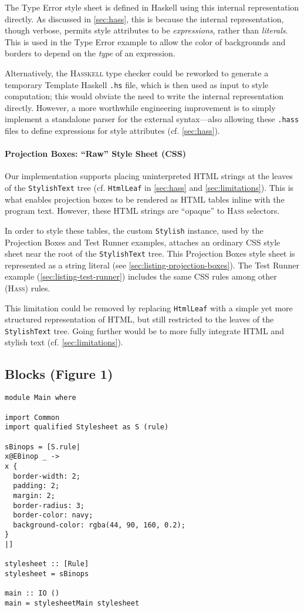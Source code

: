 \documentclass[acmsmall, screen]{acmart}
\newcommand{\parahead}[1]
  {\paragraph{\textbf{#1}}}
\newcommand{\hass}
{\textsc{Hass}}
\newcommand{\hasskell}
{\textsc{Hasskell}}
\begin{document}
\vspace{0.08in}

The Type Error style sheet is defined in Haskell using this internal representation directly.
As discussed in \autoref{sec:hass},
this is because the internal representation, though verbose, permits style attributes to be \emph{expressions}, rather than \emph{literals}.
This is used in the Type Error example to allow the color of backgrounds and borders to depend on the \textit{type} of an expression.

Alternatively, the \hasskell{} type checker could be reworked to generate a temporary Template Haskell \texttt{.hs} file, which is then used as input to style computation;
this would obviate the need to write the internal representation directly.
However, a more worthwhile engineering improvement is to simply implement a standalone parser for the external syntax---also allowing these \texttt{.hass} files to define expressions for style attributes (cf. \autoref{sec:hass}).

\parahead{Projection Boxes: ``Raw'' Style Sheet (CSS)}

Our implementation supports placing uninterpreted HTML strings at the leaves of the \texttt{StylishText} tree (cf. \texttt{HtmlLeaf} in \autoref{sec:hass} and \autoref{sec:limitations}).
This is what enables projection boxes to be rendered as HTML tables inline with the program text.
However, these HTML strings are ``opaque'' to \hass{} selectors. 

In order to style these tables, the custom \texttt{Stylish} instance, used by the Projection Boxes and Test Runner examples, attaches an ordinary CSS style sheet near the root of the \texttt{StylishText} tree.
This Projection Boxes style sheet is represented as a string literal (see \autoref{sec:listing-projection-boxes}).
The Test Runner example (\autoref{sec:listing-test-runner}) includes the same CSS rules among other (\hass{}) rules.

This limitation could be removed by replacing \texttt{HtmlLeaf} with a simple yet more structured representation of HTML, but still restricted to the leaves of the \texttt{StylishText} tree.
Going further would be to more fully integrate HTML and stylish text (cf. \autoref{sec:limitations}).

\clearpage

\subsection{Blocks (Figure 1)}
\label{sec:listing-blocks}
{\scriptsize
\begin{verbatim}
module Main where

import Common
import qualified Stylesheet as S (rule)

sBinops = [S.rule|
x@EBinop _ ->
x {
  border-width: 2;
  padding: 2;
  margin: 2;
  border-radius: 3;
  border-color: navy;
  background-color: rgba(44, 90, 160, 0.2);
}
|]

stylesheet :: [Rule]
stylesheet = sBinops

main :: IO ()
main = stylesheetMain stylesheet

\end{verbatim}}
\clearpage
\end{document}
